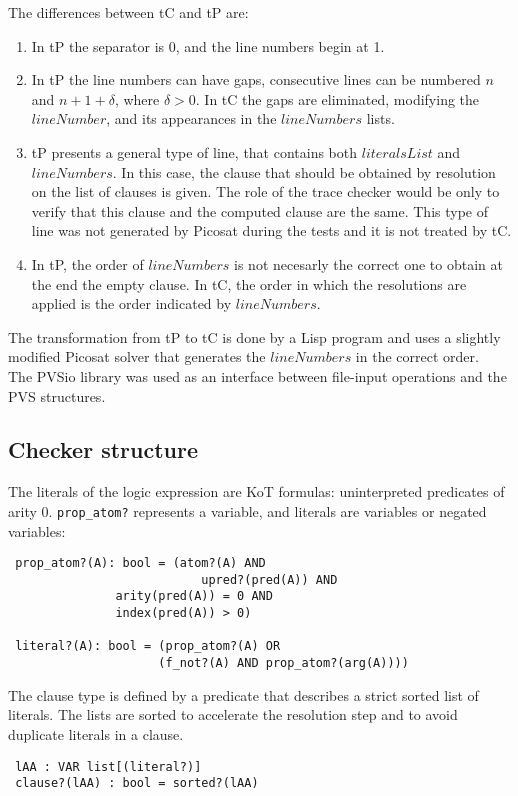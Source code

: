 \documentclass[a4paper,12pt]{article}
\begin{document}
The differences between tC and tP are: 
\begin{enumerate}
 \item In tP the separator is 0, and the line numbers begin at 1.
 \item In tP the line numbers can have gaps, consecutive lines can be numbered $ n $ and $n + 1+\delta$, where $\delta > 0$. In tC
 the gaps are eliminated, modifying the $lineNumber$, and its appearances in the $lineNumbers$ lists.
 \item tP presents a general type of line, that contains both $literalsList$ and $lineNumbers$. In this case, the clause that
should be obtained by resolution on the list of clauses is given. The role of the trace checker would be only to verify that this
clause and the computed clause are the same. This type of line was not generated by Picosat during the tests 
and it is not treated by tC.
 \item In tP, the order of $lineNumbers$ is not necesarly the correct one to obtain at the end the empty clause. In tC, the order
in which the resolutions are applied is the order indicated by $lineNumbers$.
\end{enumerate}
The transformation from tP to tC is done by a Lisp program and uses a slightly modified Picosat solver that generates the 
$lineNumbers$ in the correct order.
\\The PVSio library \cite{pvsio} was used as an interface between file-input operations and the PVS structures.

\subsection{Checker structure}

The literals of the logic expression are KoT formulas: uninterpreted predicates of arity 0. \verb|prop_atom?| represents a variable, 
and literals are variables or negated variables:
\begin{verbatim}
 prop_atom?(A): bool = (atom?(A) AND 
    	      	           upred?(pred(A)) AND 
			   arity(pred(A)) = 0 AND
			   index(pred(A)) > 0)

 literal?(A): bool = (prop_atom?(A) OR 
    		         (f_not?(A) AND prop_atom?(arg(A))))
\end{verbatim}
The clause type is defined by a predicate that describes a strict sorted list of literals. The lists are sorted to accelerate the resolution step 
and to avoid duplicate literals in a clause.
\begin{verbatim}
 lAA : VAR list[(literal?)]
 clause?(lAA) : bool = sorted?(lAA)
\end{verbatim}
\end{document}
